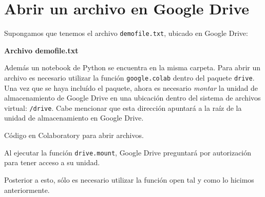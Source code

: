 \section{Abrir un archivo en Google Drive}

Supongamos que tenemos el archivo \texttt{demofile.txt}, ubicado en Google Drive:

\textbf{Archivo demofile.txt}

\begin{Shaded}
\begin{Highlighting}[]
\end{Highlighting}
\end{Shaded}

Además un notebook de Python se encuentra en la misma carpeta. Para
abrir un archivo es necesario utilizar la función \texttt{google.colab}
dentro del paquete \texttt{drive}. Una vez que se haya incluído el
paquete, ahora es necesario \emph{montar} la unidad de almacenamiento de
Google Drive en una ubicación dentro del sistema de archivos virtual:
\texttt{/drive}. Cabe mencionar que esta dirección apuntará a la raíz de
la unidad de almacenamiento en Google Drive. \\

\begin{code} Código en Colaboratory para abrir archivos.
\begin{Shaded}
\begin{Highlighting}[]
\NormalTok{)}
\end{Highlighting}
\end{Shaded}
\end{code}

Al ejecutar la función \texttt{drive.mount}, Google Drive preguntará por
autorización para tener acceso a su unidad.

Posterior a esto, sólo es necesario utilizar la función open tal y como
lo hicimos anteriormente.

\begin{Shaded}
\begin{Highlighting}[]
\OperatorTok{=} \NormalTok{(}\NormalTok{, }\NormalTok{)}
\end{Highlighting}
\end{Shaded}

